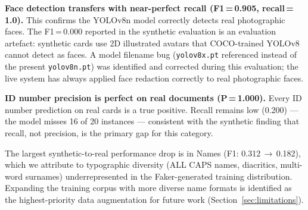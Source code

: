\textbf{Face detection transfers with near-perfect
recall (F1\,=\,0.905, recall\,=\,1.0).}
This confirms the YOLOv8n model correctly detects
real photographic faces.
The F1\,=\,0.000 reported in the synthetic
evaluation is an evaluation artefact: synthetic
cards use 2D illustrated avatars that COCO-trained
YOLOv8 cannot detect as faces.
A model filename bug (\texttt{yolov8x.pt} referenced
instead of the present \texttt{yolov8n.pt}) was
identified and corrected during this evaluation;
the live system has always applied face redaction
correctly to real photographic faces.

\textbf{ID number precision is perfect on real
documents (P\,=\,1.000).}
Every ID number prediction on real cards is a
true positive.
Recall remains low (0.200) --- the model misses 16
of 20 instances --- consistent with the synthetic
finding that recall, not precision, is the primary
gap for this category.

The largest synthetic-to-real performance drop is
in Names (F1: 0.312\,$\rightarrow$\,0.182),
which we attribute to typographic diversity
(ALL CAPS names, diacritics, multi-word surnames)
underrepresented in the Faker-generated training
distribution.
Expanding the training corpus with more diverse
name formats is identified as the highest-priority
data augmentation for future work
(Section~\ref{sec:limitations}).
